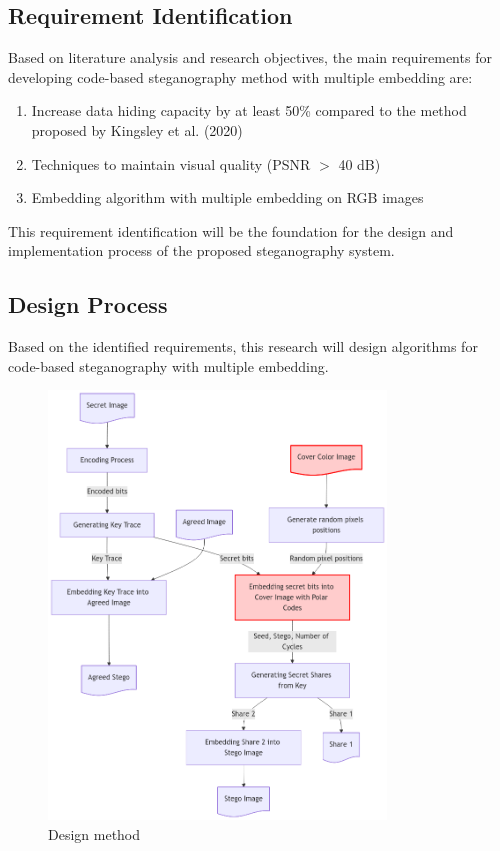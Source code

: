 \documentclass{ittelkom}
\begin{document}
\subsection{Requirement Identification}

Based on literature analysis and research objectives, the main requirements for
developing code-based steganography method with multiple embedding are:

\begin{enumerate}
    \item Increase data hiding capacity by at least 50\% compared to the method proposed
          by Kingsley et al. (2020)
    \item Techniques to maintain visual quality (PSNR $>$ 40 dB)
    \item Embedding algorithm with multiple embedding on RGB images
\end{enumerate}

This requirement identification will be the foundation for the design and
implementation process of the proposed steganography system.

\subsection{Design Process}
Based on the identified requirements, this research will design algorithms for
code-based steganography with multiple embedding.

\begin{figure}[h]
    \centering
    \includegraphics[width=0.8\textwidth]{gambar/proposed.png}
    \caption{Design method}
    \label{fig:flow}
\end{figure}
\end{document}
